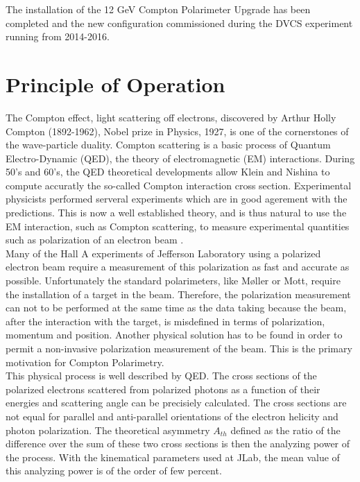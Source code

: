 The installation of the 12 GeV Compton Polarimeter Upgrade has been completed and the new configuration commissioned during the DVCS experiment running from 2014-2016.


\section {Principle of Operation}
\label{sec:compton_principle}
The Compton effect, light scattering
off electrons, discovered by Arthur Holly Compton (1892-1962), Nobel
prize in Physics, 1927, is one of the cornerstones of the wave-particle
duality. Compton scattering is a basic process of Quantum Electro-Dynamic (QED),
the theory of electromagnetic (EM) interactions.
During 50's and 60's, the QED theoretical developments allow Klein and Nishina to compute accuratly
the so-called Compton interaction cross section. Experimental physicists performed serveral experiments which
are in good agerement with the predictions. This is now a well established
theory, and is thus natural to use the EM interaction, such as Compton
scattering, to measure experimental quantities such as  polarization of an electron beam .
\\

Many of the Hall A experiments of Jefferson Laboratory using a polarized electron beam require a
measurement of this polarization as fast and accurate as possible. Unfortunately the standard
polarimeters, like M{\o}ller or Mott,
require the installation of a target in the beam. Therefore, the polarization
measurement can not to be performed at the same time as the data taking because the beam, after the
interaction with the target, is misdefined in terms of polarization, momentum and position. Another
physical solution has to be found  in order to permit a non-invasive polarization measurement of the
beam. This is the primary motivation for Compton Polarimetry.
\\

This physical process 
is well described by QED. The cross sections of the polarized
electrons scattered from  polarized photons as a function of their energies and scattering angle
can be precisiely calculated.
The cross sections are  not equal for parallel and anti-parallel orientations  of
the electron helicity and photon polarization.
The theoretical  asymmetry $A_{th}$ defined as
the ratio of the difference
over the sum of these two cross sections is then the analyzing power of the process.
With the kinematical parameters used at JLab, the mean value of this analyzing power
is of the order of few percent.
\\

